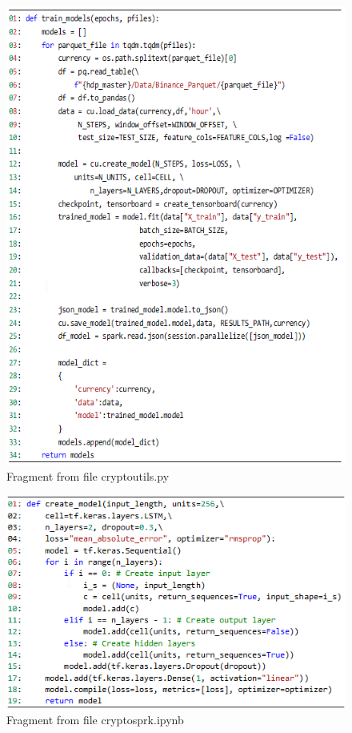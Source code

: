 \begin{figure}[H]
   \centering
   \includegraphics[width=\linewidth]{fig/CodeSnippetMLMain.png}
    \caption{Fragment from file  crypto\textunderscore utils.py}
    \label{fig:CodeSnippetMLTraining}
\end{figure}

\begin{figure}[H]
   \centering
   \includegraphics[width=\linewidth]{fig/CodeSnippetMLTraining.png}
    \caption{Fragment from file  crypto\textunderscore sprk.ipynb}
    \label{fig:CodeSnippetMLMain}
\end{figure}


